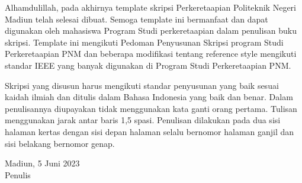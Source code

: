 \begin{spacing}{1.5}

Alhamdulillah, pada akhirnya template skripsi Perkeretaapian Politeknik Negeri Madiun telah selesai dibuat. Semoga template ini bermanfaat dan dapat digunakan oleh mahasiswa Program Studi perkeretaapian dalam penulisan buku skripsi. Template ini mengikuti Pedoman Penyusunan Skripsi program Studi Perkeretaapian PNM dan beberapa modifikasi tentang reference style mengikuti standar IEEE yang banyak digunakan di Program Studi Perkeretaapian PNM.

Skripsi yang disusun harus mengikuti standar penyusunan yang baik sesuai kaidah ilmiah dan ditulis dalam Bahasa Indonesia yang baik dan benar. Dalam penulisannya diupayakan tidak menggunakan kata ganti orang pertama. Tulisan menggunakan jarak antar baris 1,5 spasi. Penulisan dilakukan pada dua sisi halaman kertas dengan sisi depan halaman selalu bernomor halaman ganjil dan sisi belakang bernomor genap.

\vspace{6ex}
\noindent Madiun, 5 Juni 2023 \\ Penulis
\end{spacing}